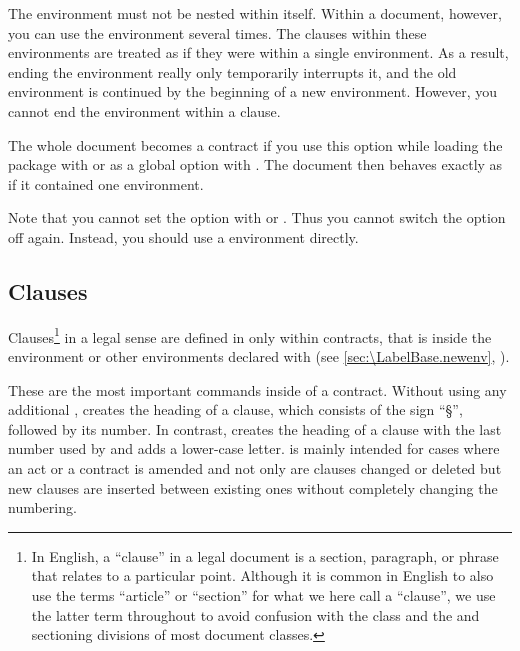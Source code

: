 The  environment must
not be nested within itself. Within a document, however, you can use the
environment several times. The clauses within these environments are treated
as if they were within a single environment. As a result, ending the
environment really only temporarily interrupts it, and the old environment is
continued by the beginning of a new environment. However, you cannot end the
environment within a clause.%
\EndIndexGroup


\begin{Declaration}
\end{Declaration}
The whole document becomes a contract if you use this option while loading the
package with %
 or as a global option with
%
. The document then behaves
exactly as if it contained one  environment.

Note that you cannot set the  option
with  or
. Thus you cannot switch the option off
again. Instead, you should use a  environment
directly.%
\EndIndexGroup


\subsection{Clauses}
\label{sec:scrjura.clause}

Clauses\footnote{%
  In English, a ``clause'' in a legal document is a section, paragraph, or
  phrase that relates to a particular point. Although it is common in English
  to also use the terms ``article'' or ``section'' for what we here call a
  ``clause'', we use the latter term throughout to avoid confusion with the
   class and the  and
   sectioning divisions of most document
  classes.} in a legal sense are defined in  only within
contracts, that is inside the  environment or
other environments declared with
 (see
\autoref{sec:\LabelBase.newenv},
).

\begin{Declaration}
\end{Declaration}
These are the most important commands inside of a contract. Without using any
additional ,  creates the heading of a clause,
which consists of the sign ``\S'', followed by its number. In contrast,
 creates the heading of a clause with the last number used by
 and adds a lower-case letter.  is mainly
intended for cases where an act or a contract is amended and not only are
clauses changed or deleted but new clauses are inserted between existing ones
without completely changing the numbering.

